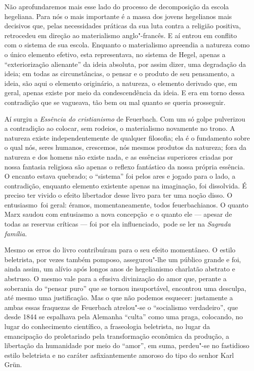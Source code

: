 Não aprofundaremos mais esse lado do processo de decomposição da escola
hegeliana. Para nós o mais importante é a massa dos jovens hegelianos
mais decisivos que, pelas necessidades práticas da sua luta contra a
religião positiva, retrocedeu em direção ao materialismo anglo"-francês.
E aí entrou em conflito com o sistema de sua escola. Enquanto o
materialismo apreendia a natureza como o único elemento efetivo, esta
representava, no sistema
de Hegel, apenas a ``exteriorização alienante'' da ideia 
absoluta, por assim dizer, uma degradação da ideia; em todas as
circunstâncias, o pensar e o produto de seu pensamento, a ideia, são %
aqui o elemento originário, a natureza, o elemento derivado que, em
geral, apenas existe por meio da condescendência da ideia. E era em torno
dessa contradição que se vagueava, tão bem ou mal quanto se queria
prosseguir.

Aí surgiu a \emph{Essência do cristianismo} de Feuerbach.
Com um só golpe pulverizou a contradição ao colocar, sem rodeios,
o materialismo novamente no trono. A natureza existe independentemente
de qualquer filosofia; ela é o fundamento sobre o qual nós, seres
humanos, crescemos, nós mesmos produtos da natureza; fora da natureza e
dos homens não existe nada, e as essências superiores criadas por nossa
fantasia religiosa são apenas o reflexo fantástico da nossa própria
essência. O encanto estava quebrado; o ``sistema'' foi pelos ares e
jogado para o lado, a contradição, enquanto elemento existente apenas na
imaginação, foi dissolvida. É preciso ter vivido o
efeito libertador desse livro para ter uma noção disso. O entusiasmo\est\ foi
geral: éramos, momentaneamente, todos feuerbachianos. O quanto Marx
saudou com entusiasmo a nova concepção \textbar{}\,e o quanto ele --- apesar de
todas as reservas críticas --- foi por ela influenciado,\,\textbar{} pode se ler
na \emph{Sagrada família}.

Mesmo os erros do livro contribuíram para o seu efeito momentâneo. O
estilo beletrista, por vezes também pomposo, assegurou"-lhe um público
grande e foi, ainda assim, um alívio após longos anos de hegelianismo
charlatão abstrato e abstruso. O mesmo vale para a efusiva divinização
do amor que, perante a soberania do ``pensar puro'' que se tornou
insuportável, encontrou uma desculpa, até mesmo uma justificação. Mas o
que não podemos esquecer: justamente a ambas essas fraquezas
de Feuerbach
atrelou"-se o ``socialismo verdadeiro'', que desde 1844 se espalhava pela
Alemanha ``culta'' como uma praga, colocando, no lugar do conhecimento
científico, a fraseologia beletrista, no lugar da emancipação do
proletariado pela transformação econômica da 
produção, a libertação da humanidade por meio do ``amor'', em suma,
perdeu"-se no fastidioso estilo beletrista e no caráter asfixiantemente
amoroso do tipo do senhor Karl Grün.

